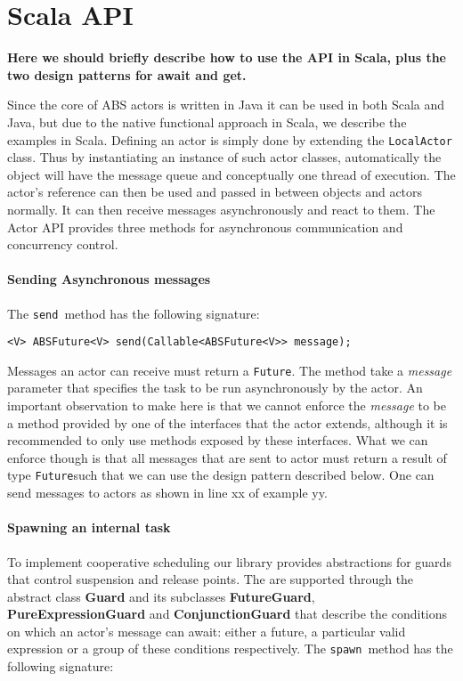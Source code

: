\section{Scala API}
\label{scalaapi}

\newcommand{\future}{\lstinline{Future}}
\newcommand{\send}{\lstinline{send}}
\newcommand{\spawn}{\lstinline{spawn}}
\newcommand{\gspawn}{\lstinline{getSpawn}}


{\bf Here we should briefly describe how to use the API in Scala, plus the two design patterns for await and get.}

Since the core of ABS actors is written in Java it can be used in both Scala and Java, but due to the native functional approach in Scala, we describe the examples in Scala.
Defining an actor is simply done by extending the \lstinline{LocalActor} class. Thus by instantiating an instance of such actor classes, automatically the object will have the message queue and conceptually one thread of execution. The actor's reference can then be used and passed in between objects and actors normally. It can then receive messages asynchronously and react to them.  
The Actor API provides three methods for asynchronous communication and concurrency control.

\paragraph{Sending Asynchronous messages}
 The \send  ~method has the following signature:
\begin{lstlisting}
<V> ABSFuture<V> send(Callable<ABSFuture<V>> message);
\end{lstlisting}
Messages an actor can receive must return a \future. The method take a \textit{message} parameter that specifies the task to be run asynchronously by the actor. An important observation to make here is that we cannot enforce the \textit{message} to be a method provided by one of the interfaces that the actor extends, although it is recommended to only use methods exposed by these interfaces. What we can enforce though is that all messages that are sent to actor must return a result of type \future such that we can use the design pattern described below. 
One can send messages to actors as shown in line xx of example yy.



\paragraph{Spawning an internal task}
To implement cooperative scheduling our library provides abstractions for guards that control suspension and release points. The are supported through the abstract class \textbf{Guard} and its subclasses \textbf{FutureGuard}, \textbf{PureExpressionGuard} and \textbf{ConjunctionGuard} that describe the conditions on which an actor's message can await: either a future, a particular valid expression or a group of these conditions respectively. The \spawn ~method has the following signature:

